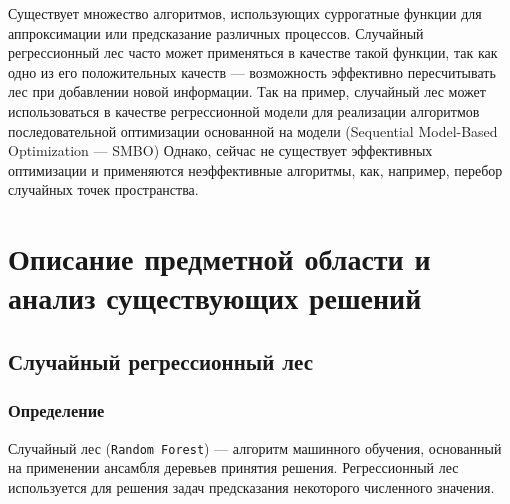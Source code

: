 \documentclass[pscyr,specification,annotation]{itmo-student-thesis}
\begin{document}





\tableofcontents

\prefacepage{}

Существует множество алгоритмов, использующих суррогатные функции для аппроксимации или предсказание различных процессов.
Случайный регрессионный лес часто может применяться в качестве такой функции, так как одно из его положительных качеств ---
возможность эффективно пересчитывать лес при добавлении новой информации. Так на пример, случайный лес может использоваться
в качестве регрессионной модели для реализации алгоритмов последовательной оптимизации основанной на модели 
(Sequential Model-Based Optimization --- SMBO)
Однако, сейчас не существует эффективных оптимизации и применяются неэффективные алгоритмы, как, например, перебор случайных
точек пространства.

\chapter{Описание предметной области и анализ существующих решений}

\section{Случайный регрессионный лес}\label{sec:random_forest}
\subsection{Определение}
Случайный лес (\texttt{Random Forest}) --- алгоритм машинного обучения, основанный на применении ансамбля деревьев принятия решения.
Регрессионный лес используется для решения задач предсказания некоторого численного значения.
\end{document}
